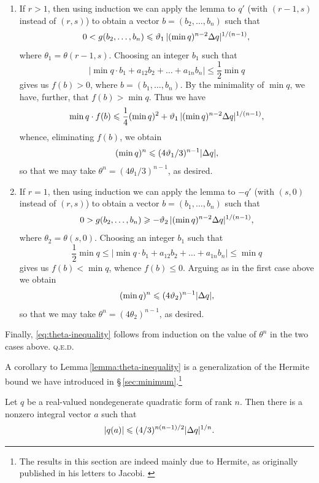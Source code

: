 \medskip

\begin{enumerate}[wide, nosep, label=(\roman*)]
    \item If \(r > 1\), then using induction we can apply the lemma to \(q'\) (with \((r-1, s)\) instead of \((r, s)\)) to obtain a vector \(b = (b_2, \dots, b_n)\) such that
    \[
        0 < g(b_2, \dots, b_n) \leqslant \vartheta_1\,|(\min q)^{n-2} {\Delta} q|^{1/(n-1)},
    \]
    where \(\theta_1 = \theta(r-1, s)\). Choosing an integer \(b_1\) such that
    \[
        |\min q\cdot b_1 + a_{12} b_2 + \dots + a_{1n} b_n| \leq \frac{1}{2}\min q
    \]
    gives us \(f(b) > 0\), where \(b = (b_1, \dots, b_n)\). By the minimality of \(\min q\), we have, further, that \(f(b) > \min q\). Thus we have
    \[
        \min q \cdot f(b) \leqslant \frac{1}{4}(\min q)^2 + \vartheta_1\,|(\min q)^{n-2} {\Delta} q|^{1/(n-1)},
    \]
    whence, eliminating \(f(b)\), we obtain
    \[
        (\min q)^n \leqslant (4\vartheta_1/3)^{n-1} |{\Delta} q|,
    \]
    so that we may take \(\theta^n = (4\theta_1/3)^{n-1}\), as desired.

    \item If \(r = 1\), then using induction we can apply the lemma to \(-q'\) (with \((s,0)\) instead of \((r, s)\)) to obtain a vector \(b = (b_1, \dots, b_n)\) such that
    \[
        0 > g(b_2, \dots, b_n) \geqslant -\vartheta_2\,|(\min q)^{n-2} {\Delta} q|^{1/(n-1)},
    \]
    where \(\theta_2 = \theta(s, 0)\). Choosing an integer \(b_1\) such that
    \[
        \frac{1}{2}\min q \leq |\min q\cdot b_1 + a_{12} b_2 + \dots + a_{1n} b_n| \leq \min q
    \]
    gives us \(f(b) < \min q\), whence \(f(b) \leq 0\). Arguing as in the first case above we obtain
    \[
        (\min q)^n \leqslant (4\vartheta_2)^{n-1} |{\Delta} q|,
    \]
    so that we may take \(\theta^n = (4\theta_2)^{n-1}\), as desired.
\end{enumerate}

Finally, \eqref{eq:theta-inequality} follows from induction on the value of \(\theta^n\) in the two cases above. {\scshape q.e.d.}

\medskip

A corollary to Lemma\,\ref{lemma:theta-inequality} is a generalization of the Hermite bound we have introduced in \S\,\ref{sec:minimum}.\footnote{The results in this section are indeed mainly due to Hermite, as originally published in his letters to Jacobi. \cite{hermite1850extraits}}

\begin{corollary}
    Let \(q\) be a real-valued nondegenerate quadratic form of rank \(n\). Then there is a nonzero integral vector \(a\) such that
    \[
        |q(a)| \leqslant (4/3)^{n(n-1)/2} |{\Delta} q|^{1/n}.
    \]
\end{corollary}

